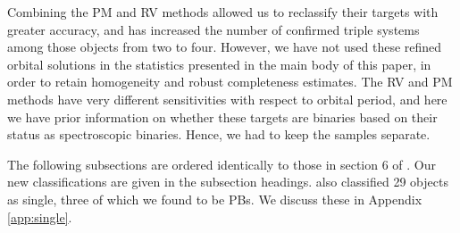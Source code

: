 \documentclass[a4paper,fleqn,usenatbib]{mnras}
\begin{document}
Combining the PM and RV methods allowed us to reclassify their targets with greater accuracy, and has increased the number of confirmed triple systems among those objects from two to four. However, we have not used these refined orbital solutions in the statistics presented in the main body of this paper, in order to retain homogeneity and robust completeness estimates. The RV and PM methods have very different sensitivities with respect to orbital period, and here we have prior information on whether these targets are binaries based on their status as spectroscopic binaries. Hence, we had to keep the samples separate.

The following subsections are ordered identically to those in section 6 of \citet{lampensetal2017}. Our new classifications are given in the subsection headings. \citeauthor{lampensetal2017} also classified 29 objects as single, three of which we found to be PBs. We discuss these in Appendix\,\ref{app:single}.
\end{document}
